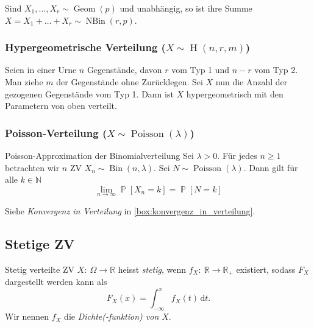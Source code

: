 \documentclass[a4paper,10pt]{article}
\def\N{\mathbb{N}}
\def\R{\mathbb{R}}
\renewcommand{\P}{\operatorname{\mathbb{P}}}
\DeclareMathOperator{\Bin}{Bin}
\DeclareMathOperator{\Geom}{Geom}
\DeclareMathOperator{\NBin}{NBin}
\DeclareMathOperator{\hypergeom}{H}
\DeclareMathOperator{\Poisson}{Poisson}
\numberwithin{equation}{section}
\begin{document}
Sind \( X_1, \dots, X_r \sim \Geom(p) \) und unabhängig, so ist ihre Summe \( X = X_1 + \dots + X_r \sim \NBin(r, p) \).

\subsubsection{Hypergeometrische Verteilung (\( X \sim \hypergeom(n, r, m) \))}

\begin{subbox}{}
    Seien in einer Urne \( n \) Gegenstände, davon \( r \) vom Typ 1 und \( n - r \) vom Typ 2. Man ziehe \( m \) der Gegenstände ohne Zurücklegen. Sei \( X \) nun die Anzahl der gezogenen Gegenstände vom Typ 1. Dann ist \( X \) hypergeometrisch mit den Parametern von oben verteilt.
\end{subbox}

\subsubsection{Poisson-Verteilung (\( X \sim \Poisson(\lambda) \))}

\begin{subbox}{Poisson-Approximation der Binomialverteilung}
    Sei \( \lambda > 0 \). Für jedes \( n \geq 1 \) betrachten wir \( n \) ZV \( X_n \sim \Bin(n, \lambda) \). Sei \( N \sim \Poisson(\lambda) \). Dann gilt für alle \( k \in \N \)
    \[
        \lim_{n \to \infty} \P[X_n = k] = \P[N = k]
    \]
\end{subbox}

Siehe \emph{Konvergenz in Verteilung} in  \ref{box:konvergenz_in_verteilung}.

\subsection{Stetige ZV}

\begin{mainbox}{Stetig verteilte ZV}
    \( X: \: \Omega \to \R \) heisst \emph{stetig}, wenn \( f_X: \: \R \to \R_+ \) existiert, sodass \( F_X \) dargestellt werden kann als
    \[
        F_X(x) = \int_{-\infty}^x f_X(t) \, \mathrm{d}t \text{.}
    \]
    Wir nennen \( f_X \) die \emph{Dichte(-funktion) von \( X \)}.
\end{mainbox}

\end{document}
